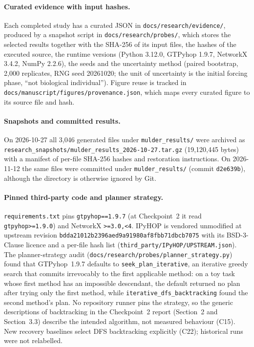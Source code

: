 \paragraph{Curated evidence with input hashes.}
Each completed study has a curated JSON in \texttt{docs/\allowbreak{}research/\allowbreak{}evidence/\allowbreak{}}, produced by a snapshot script in
\texttt{docs/\allowbreak{}research/\allowbreak{}probes/\allowbreak{}}, which stores the selected results together with the SHA-256 of its input files,
the hashes of the executed source, the runtime versions (Python 3.12.0, GTPyhop 1.9.7, NetworkX 3.4.2,
NumPy 2.2.6), the seeds and the uncertainty method (paired bootstrap, 2,000 replicates, RNG seed 20261020;
the unit of uncertainty is the initial forcing phase, ``not biological individual''). Figure reuse is tracked in
\texttt{docs/\allowbreak{}manuscript/\allowbreak{}figures/\allowbreak{}provenance.json}, which maps every curated figure to its source file and hash.

\paragraph{Snapshots and committed results.}
On 2026-10-27 all 3,046 generated files under \texttt{mulder\_results/} were archived as
\texttt{research\_\allowbreak{}snapshots/\allowbreak{}mulder\_\allowbreak{}results\_\allowbreak{}2026-10-27.tar.gz} (19,120,445 bytes) with a manifest of per-file
SHA-256 hashes and restoration instructions. On 2026-11-12 the same files were committed under
\texttt{mulder\_results/} (commit \texttt{d2e639b}), although the directory is otherwise ignored by Git.

\paragraph{Pinned third-party code and planner strategy.}
\texttt{requirements.txt} pins \texttt{gtpyhop==1.9.7} (at Checkpoint~2 it read \texttt{gtpyhop>=1.9.0}) and
NetworkX \texttt{>=3.0,<4}. IPyHOP is vendored unmodified at upstream revision
\texttt{bdda21012b2396aed9a9\allowbreak{}1980af8fbb71dbcb7075} with its BSD-3-Clause licence and a per-file hash list
(\texttt{third\_\allowbreak{}party/\allowbreak{}IPyHOP/\allowbreak{}UPSTREAM.json}). The planner-strategy audit
(\texttt{docs/\allowbreak{}research/\allowbreak{}probes/\allowbreak{}planner\_\allowbreak{}strategy.py}) found that GTPyhop~1.9.7 defaults to
\texttt{seek\_\allowbreak{}plan\_\allowbreak{}iterative}, an iterative greedy search that commits irrevocably to the first applicable
method: on a toy task whose first method has an impossible descendant, the default returned no plan after trying
only the first method, while \texttt{iterative\_\allowbreak{}dfs\_\allowbreak{}backtracking} found the second method's plan. No repository
runner pins the strategy, so the generic descriptions of backtracking in the Checkpoint~2 report (Section~2 and
Section~3.3) describe the intended algorithm, not measured behaviour (C15). New recovery baselines select DFS
backtracking explicitly (C22); historical runs were not relabelled.

